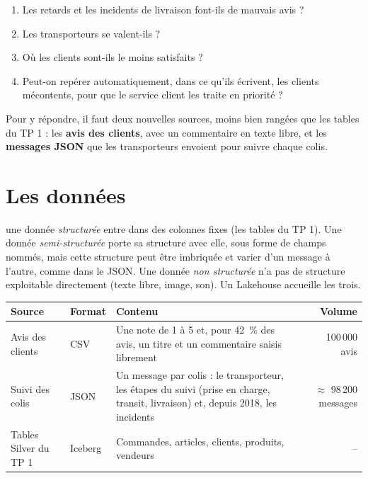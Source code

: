 \begin{enumerate}[leftmargin=*,nosep]
  \item Les retards et les incidents de livraison font-ils de mauvais avis ?
  \item Les transporteurs se valent-ils ?
  \item Où les clients sont-ils le moins satisfaits ?
  \item Peut-on repérer automatiquement, dans ce qu'ils écrivent, les clients mécontents, pour que le
        service client les traite en priorité ?
\end{enumerate}

Pour y répondre, il faut deux nouvelles sources, moins bien rangées que les tables du TP 1 : les
\textbf{avis des clients}, avec un commentaire en texte libre, et les \textbf{messages JSON} que les
transporteurs envoient pour suivre chaque colis.

\section{Les données}

\begin{notion}
une donnée \emph{structurée} entre dans des
colonnes fixes (les tables du TP 1). Une donnée \emph{semi-structurée} porte sa structure avec elle,
sous forme de champs nommés, mais cette structure peut être imbriquée et varier d'un message à
l'autre, comme dans le JSON. Une donnée \emph{non structurée} n'a pas de structure exploitable
directement (texte libre, image, son). Un Lakehouse accueille les trois.
\end{notion}

\begin{center}
\small
\renewcommand{\arraystretch}{1.25}
\begin{tabularx}{\textwidth}{@{}l l X r@{}}
\toprule
\textbf{Source} & \textbf{Format} & \textbf{Contenu} & \textbf{Volume} \\
\midrule
Avis des clients & CSV & Une note de 1 à 5 et, pour 42~\% des avis, un titre et un commentaire
  saisis librement & 100\,000 avis \\
Suivi des colis & JSON & Un message par colis : le transporteur, les étapes du suivi
  (prise en charge, transit, livraison) et, depuis 2018, les incidents & $\approx$ 98\,200 messages \\
Tables Silver du TP 1 & Iceberg & Commandes, articles, clients, produits, vendeurs & -- \\
\bottomrule
\end{tabularx}
\end{center}

